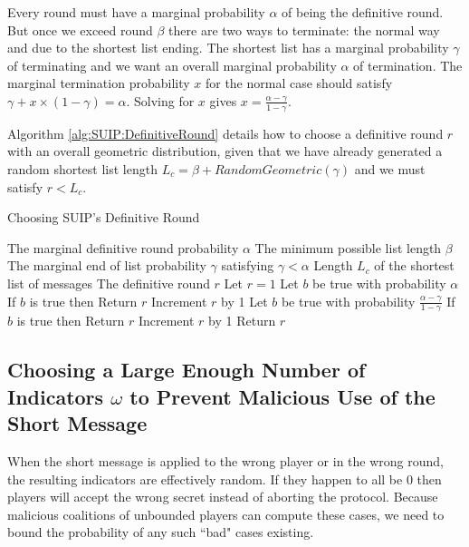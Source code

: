 \documentclass[12pt]{dalcsthesis}
\begin{document}
Every round must have a marginal probability $\alpha$ of being the definitive round. But once we exceed round $\beta$ there are two ways to terminate: the normal way and due to the shortest list ending. The shortest list has a marginal probability $\gamma$ of terminating and we want an overall marginal probability $\alpha$ of termination. The marginal termination probability $x$ for the normal case should satisfy $\gamma + x \times (1 - \gamma) = \alpha$. Solving for $x$ gives $x = \frac{\alpha - \gamma}{1 - \gamma}$.

Algorithm \ref{alg:SUIP:DefinitiveRound} details how to choose a definitive round $r$ with an overall geometric distribution, given that we have already generated a random shortest list length $L_c = \beta + RandomGeometric(\gamma)$ and we must satisfy $r < L_c$.

\begin{algorithm}
  \caption{Choosing SUIP's Definitive Round}
  \label{alg:SUIP:DefinitiveRound}
  \begin{algorithmic}
    \INPUT The marginal definitive round probability $\alpha$ 
    \INPUT The minimum possible list length $\beta$
    \INPUT The marginal end of list probability $\gamma$ satisfying $\gamma < \alpha$
    \INPUT Length $L_c$ of the shortest list of messages
    \OUTPUT The definitive round $r$
    \STATE Let $r = 1$
      \STATE Let $b$ be true with probability $\alpha$
      \STATE If $b$ is true then Return $r$
      \STATE Increment $r$ by 1 
    \ENDWHILE
      \STATE Let $b$ be true with probability $\frac{\alpha - \gamma}{1 - \gamma}$
      \STATE If $b$ is true then Return $r$
      \STATE Increment $r$ by 1
    \ENDWHILE
    \STATE Return $r$
  \end{algorithmic}
\end{algorithm}

\subsection{Choosing a Large Enough Number of Indicators $\omega$ to Prevent Malicious Use of the Short Message}
\label{Sec:SUIP:MinIndicators}

When the short message is applied to the wrong player or in the wrong round, the resulting indicators are effectively random. If they happen to all be 0 then players will accept the wrong secret instead of aborting the protocol. Because malicious coalitions of unbounded players can compute these cases, we need to bound the probability of any such ``bad" cases existing.
\end{document}
